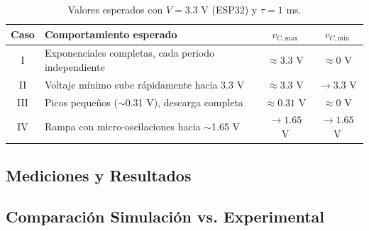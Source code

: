 \documentclass[12pt,a4paper]{article}
\begin{document}
\begin{table}[H]
    \centering
    \caption{Valores esperados con $V = 3.3$ V (ESP32) y $\tau = 1$ ms.}
    \begin{tabular}{clcc}
        \toprule
        Caso & Comportamiento esperado & $v_{C,\text{max}}$ & $v_{C,\text{min}}$ \\
        \midrule
        I   & Exponenciales completas, cada periodo independiente & $\approx 3.3$ V & $\approx 0$ V \\
        II  & Voltaje m\'inimo sube r\'apidamente hacia 3.3 V & $\approx 3.3$ V & $\to 3.3$ V \\
        III & Picos peque\~nos ($\sim$0.31 V), descarga completa & $\approx 0.31$ V & $\approx 0$ V \\
        IV  & Rampa con micro-oscilaciones hacia $\sim$1.65 V & $\to 1.65$ V & $\to 1.65$ V \\
        \bottomrule
    \end{tabular}
    \label{tab:esperados_fisico}
\end{table}

\subsection{Mediciones y Resultados}


\subsection{Comparaci\'on Simulaci\'on vs. Experimental}

\end{document}
